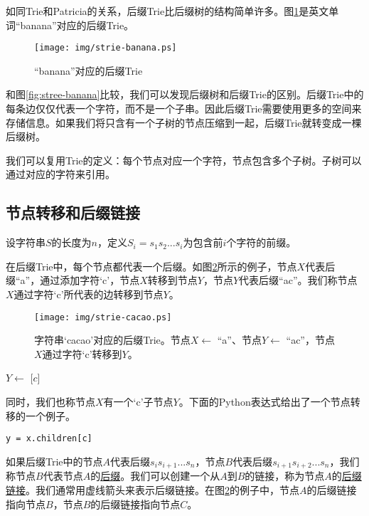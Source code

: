 \documentclass{ctexart}
\begin{document}
如同Trie和Patricia的关系，后缀Trie比后缀树的结构简单许多。图\ref{fig:strie-banana}是英文单词“banana”对应的后缀Trie。

\begin{figure}[htbp]
  \centering
  \texttt{[image: img/strie-banana.ps]}
  \caption{“banana”对应的后缀Trie} \label{fig:strie-banana}
\end{figure}

和图\ref{fig:stree-banana}比较，我们可以发现后缀树和后缀Trie的区别。后缀Trie中的每条边仅仅代表一个字符，而不是一个子串。因此后缀Trie需要使用更多的空间来存储信息。如果我们将只含有一个子树的节点压缩到一起，后缀Trie就转变成一棵后缀树。

我们可以复用Trie的定义：每个节点对应一个字符，节点包含多个子树。子树可以通过对应的字符来引用。

\subsection{节点转移和后缀链接}

设字符串$S$的长度为$n$，定义$S_i=s_1s_2...s_i$为包含前$i$个字符的前缀。

在后缀Trie中，每个节点都代表一个后缀。如图\ref{fig:strie-cacao}所示的例子，节点$X$代表后缀“a”，通过添加字符‘c’，节点$X$转移到节点$Y$，节点$Y$代表后缀“ac”。我们称节点$X$通过字符‘c’所代表的边转移到节点$Y$\cite{ukkonen95}。

\begin{figure}[htbp]
  \centering
  \texttt{[image: img/strie-cacao.ps]}
  \caption{字符串‘cacao’对应的后缀Trie。节点$X \gets$ “a”、节点$Y \gets$ “ac”，节点$X$通过字符‘c’转移到$Y$。}
  \label{fig:strie-cacao}
\end{figure}

\begin{algorithmic}
\State $Y \gets$ [$c$]
\end{algorithmic}

同时，我们也称节点$X$有一个‘c’子节点$Y$。下面的Python表达式给出了一个节点转移的一个例子。

\lstset{language=python}
\begin{lstlisting}
y = x.children[c]
\end{lstlisting}

如果后缀Trie中的节点$A$代表后缀$s_is_{i+1}...s_n$，节点$B$代表后缀$s_{i+1}s_{i+2}...s_n$，我们称节点$B$代表节点$A$的\underline{后缀}。我们可以创建一个从$A$到$B$的链接，称为节点$A$的\underline{后缀链接}\cite{ukkonen95}。我们通常用虚线箭头来表示后缀链接。在图\ref{fig:strie-cacao}的例子中，节点$A$的后缀链接指向节点$B$，节点$B$的后缀链接指向节点$C$。
\end{document}
